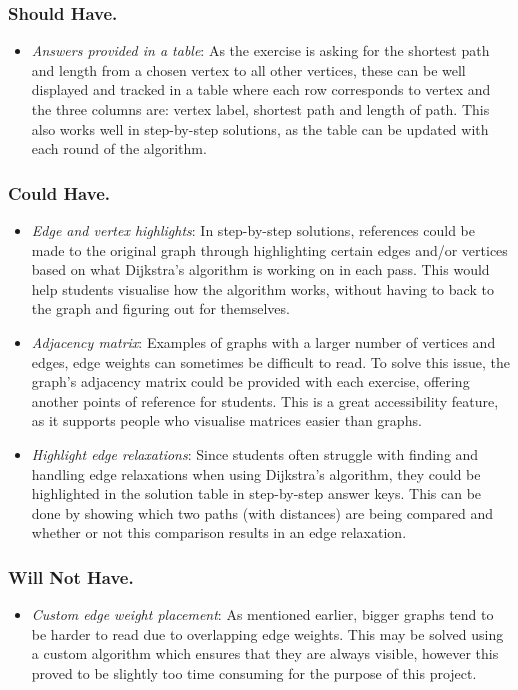 \documentclass{l4proj}
\begin{document}
\subsubsection{Should Have.}
\begin{itemize}
	\item
	\emph{Answers provided in a table}: As the exercise is asking for the shortest path and length from a chosen vertex to all other vertices, these can be well displayed and tracked in a table where each row corresponds to vertex and the three columns are: vertex label, shortest path and length of path. This also works well in step-by-step solutions, as the table can be updated with each round of the algorithm.
\end{itemize}
\subsubsection{Could Have.}
\begin{itemize}
	\item
	\emph{Edge and vertex highlights}: In step-by-step solutions, references could be made to the original graph through highlighting certain edges and/or vertices based on what Dijkstra's algorithm is working on in each pass. This would help students visualise how the algorithm works, without having to back to the graph and figuring out for themselves.
	\item
	\emph{Adjacency matrix}: Examples of graphs with a larger number of vertices and edges, edge weights can sometimes be difficult to read. To solve this issue, the graph's adjacency matrix could be provided with each exercise, offering another points of reference for students. This is a great accessibility feature, as it supports people who visualise matrices easier than graphs.
	\item
	\emph{Highlight edge relaxations}: Since students often struggle with finding and handling edge relaxations \cite{} when using Dijkstra's algorithm, they could be highlighted in the solution table in step-by-step answer keys. This can be done by showing which two paths (with distances) are being compared and whether or not this comparison results in an edge relaxation.
\end{itemize}
\subsubsection{Will Not Have.}
\begin{itemize}
	\item
	\emph{Custom edge weight placement}: As mentioned earlier, bigger graphs tend to be harder to read due to overlapping edge weights. This may be solved using a custom algorithm which ensures that they are always visible, however this proved to be slightly too time consuming for the purpose of this project.
\end{itemize}
\end{document}

